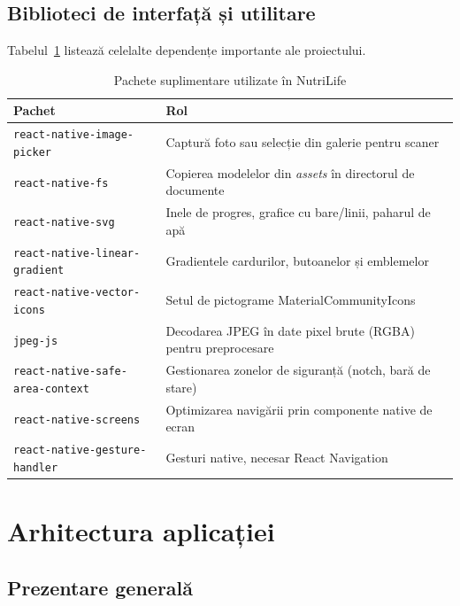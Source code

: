 \documentclass[12pt, a4paper, twoside]{report}
\numberwithin{equation}{section}
\begin{document}
\section{Biblioteci de interfață și utilitare}

Tabelul~\ref{tab:pachete} listează celelalte dependențe importante ale proiectului.

\begin{table}[H]
\centering
\caption{Pachete suplimentare utilizate în NutriLife}
\label{tab:pachete}
\begin{tabularx}{\textwidth}{lX}
\toprule
\textbf{Pachet} & \textbf{Rol} \\
\midrule
\texttt{react-native-image-picker} & Captură foto sau selecție din galerie pentru scaner \\
\texttt{react-native-fs} & Copierea modelelor din \textit{assets} în directorul de documente \\
\texttt{react-native-svg} & Inele de progres, grafice cu bare/linii, paharul de apă \\
\texttt{react-native-linear-gradient} & Gradientele cardurilor, butoanelor și emblemelor \\
\texttt{react-native-vector-icons} & Setul de pictograme MaterialCommunityIcons \\
\texttt{jpeg-js} & Decodarea JPEG în date pixel brute (RGBA) pentru preprocesare \\
\texttt{react-native-safe-area-context} & Gestionarea zonelor de siguranță (notch, bară de stare) \\
\texttt{react-native-screens} & Optimizarea navigării prin componente native de ecran \\
\texttt{react-native-gesture-handler} & Gesturi native, necesar React Navigation \\
\bottomrule
\end{tabularx}
\end{table}

\chapter{Arhitectura aplicației}

\section{Prezentare generală}
\end{document}

